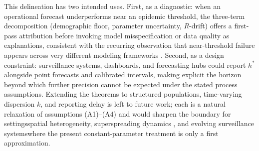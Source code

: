 \documentclass[review]{elsarticle}
\theoremstyle{plain}
\theoremstyle{definition}
\begin{document}
This delineation has two intended uses. First, as a diagnostic: when an operational forecast underperforms near an epidemic threshold, the three-term decomposition (demographic floor, parameter uncertainty, $R$-drift) offers a first-pass attribution before invoking model misspecification or data quality as explanations, consistent with the recurring observation that near-threshold failure appears across very different modeling frameworks \citep{funk2018realtime, held2017probabilistic, viboud2018rapidd}. Second, as a design constraint: surveillance systems, dashboards, and forecasting hubs \citep{mcgowan2019collaborative, johansson2019open, cramer2022evaluation} could report $h^*$ alongside point forecasts and calibrated intervals, making explicit the horizon beyond which further precision cannot be expected under the stated process assumptions. Extending the theorems to structured populations, time-varying dispersion $k$, and reporting delay is left to future work; each is a natural relaxation of assumptions (A1)--(A4) and would sharpen the boundary for settings\textemdash spatial heterogeneity, superspreading dynamics \citep{lloydsmith2005should}, and evolving surveillance systems\textemdash where the present constant-parameter treatment is only a first approximation.




\end{document}
